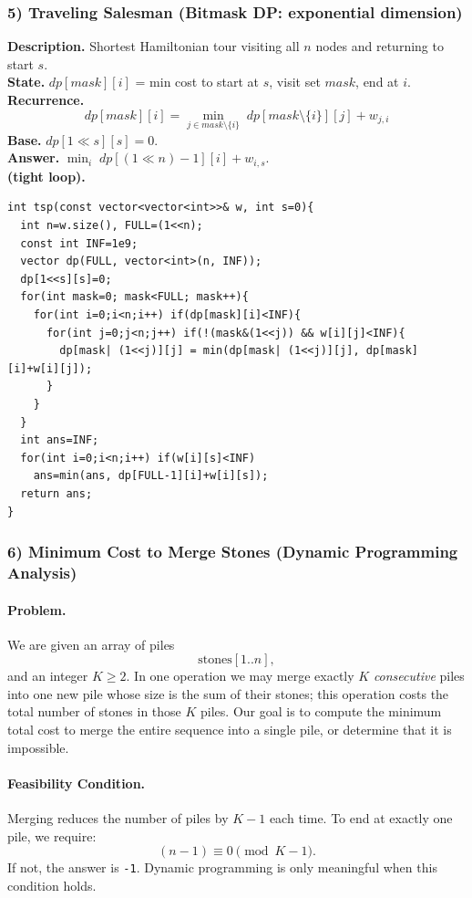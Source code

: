 \documentclass[9pt]{extarticle}
\begin{document}
\subsubsection{5) Traveling Salesman (Bitmask DP: exponential dimension)}
\textbf{Description.} Shortest Hamiltonian tour visiting all \(n\) nodes and returning to start \(s\).  \\
\textbf{State.} \(dp[mask][i]\) = min cost to start at \(s\), visit set \(mask\), end at \(i\).  \\
\textbf{Recurrence.}
\[
dp[mask][i]=\min_{j\in mask\setminus\{i\}} \; dp[mask\setminus\{i\}][j] + w_{j,i}
\]
\textbf{Base.} \(dp[1\ll s][s]=0\).  \\
\textbf{Answer.} \(\min_i \; dp[(1\ll n)-1][i] + w_{i,s}\).  \\
\textbf{(tight loop).}
\begin{verbatim}
int tsp(const vector<vector<int>>& w, int s=0){
  int n=w.size(), FULL=(1<<n);
  const int INF=1e9;
  vector dp(FULL, vector<int>(n, INF));
  dp[1<<s][s]=0;
  for(int mask=0; mask<FULL; mask++){
    for(int i=0;i<n;i++) if(dp[mask][i]<INF){
      for(int j=0;j<n;j++) if(!(mask&(1<<j)) && w[i][j]<INF){
        dp[mask| (1<<j)][j] = min(dp[mask| (1<<j)][j], dp[mask][i]+w[i][j]);
      }
    }
  }
  int ans=INF;
  for(int i=0;i<n;i++) if(w[i][s]<INF)
    ans=min(ans, dp[FULL-1][i]+w[i][s]);
  return ans;
}
\end{verbatim}
\subsubsection{6) Minimum Cost to Merge Stones (Dynamic Programming Analysis)}

\paragraph{Problem.}
We are given an array of piles
\[
  \text{stones}[1..n],
\]
and an integer $K \ge 2$.  
In one operation we may merge exactly $K$ \emph{consecutive} piles into one new pile whose size is the sum of their stones; this operation costs the total number of stones in those $K$ piles.  
Our goal is to compute the minimum total cost to merge the entire sequence into a single pile, or determine that it is impossible.

\paragraph{Feasibility Condition.}
Merging reduces the number of piles by $K-1$ each time.  
To end at exactly one pile, we require:
\[
  (n - 1) \equiv 0 \pmod{K - 1}.
\]
If not, the answer is \texttt{-1}.  
Dynamic programming is only meaningful when this condition holds.
\end{document}
